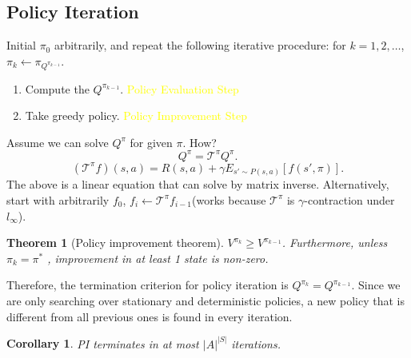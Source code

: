 \documentclass{report}
\newtheorem{theorem}{Theorem}[section]
\newtheorem{corollary}{Corollary}[theorem]
\begin{document}
\subsection{Policy Iteration}
Initial $\pi_0$ arbitrarily, and repeat the following iterative procedure: for $k=1,2,\hdots$, $\pi_k \leftarrow \pi_{Q^{\pi_{k-1}}}$.
\begin{enumerate}
    \item Compute the $Q^{\pi_{k-1}}$. \textcolor{yellow}{Policy Evaluation Step}
    \item Take greedy policy. \textcolor{yellow}{Policy Improvement Step}
\end{enumerate}
Assume we can solve $Q^{\pi}$ for given $\pi$. How?
\[
Q^{\pi}=\mathcal{T}^{\pi}Q^{\pi}.
\]
\[
 (\mathcal{T}^{\pi}f)(s,a)=R(s,a)+\gamma E_{s'\sim P(s,a)}[f(s',\pi)].
\]
The above is a linear equation that can solve by matrix inverse. Alternatively, start with arbitrarily $f_0$, $f_i \leftarrow \mathcal{T}^{\pi}f_{i-1}$(works because $\mathcal{T}^{\pi}$ is $\gamma$-contraction under $l_{\infty}$).
\begin{theorem}[Policy improvement theorem]
 $V^{\pi_k} \geq V^{\pi_{k-1}}$. Furthermore, unless $\pi_k=\pi^*$ , improvement in at least 1 state is non-zero.\cite{Puterman2005MarkovProgramming}
\end{theorem}
Therefore, the termination criterion for policy iteration is $Q^{\pi_k}=Q^{\pi_{k-1}}$. Since we are only searching over stationary and deterministic policies, a new policy that is different from all previous ones is found in every iteration.
\begin{corollary}
PI terminates in at most $|A|^{|S|}$ iterations.
\end{corollary}
\end{document}
